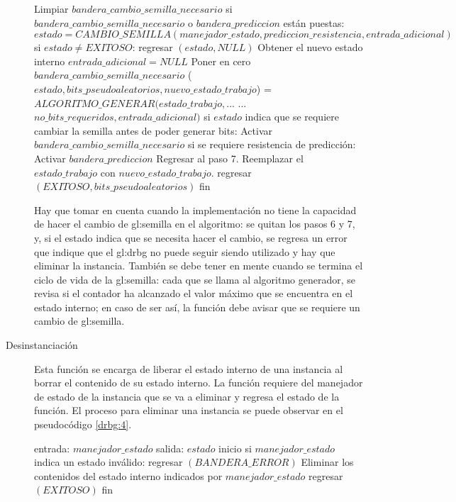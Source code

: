 \begin{description}
\begin{pseudocodigo}[caption={DRBG, generación.}, label={drbg:3}]
      Limpiar $bandera\_cambio\_semilla\_necesario$
      si $bandera\_cambio\_semilla\_necesario$ o $bandera\_prediccion$ están puestas:
        $estado = CAMBIO\_SEMILLA(manejador\_estado, prediccion\_resistencia, entrada\_adicional)$
        si $estado \neq EXITOSO$:
          regresar $(estado, NULL)$
        Obtener el nuevo estado interno
        $entrada\_adicional = NULL$
        Poner en cero $bandera\_cambio\_semilla\_necesario$
      ($estado, bits\_pseudoaleatorios, nuevo\_estado\_trabajo$) = $ALGORITMO\_GENERAR(estado\_trabajo,$...
        ...$no\_bits\_requeridos, entrada\_adicional)$
      si $estado$ indica que se requiere cambiar la semilla antes de poder generar bits:
        Activar $bandera\_cambio\_semilla\_necesario$
        si se requiere resistencia de predicción:
          Activar $bandera\_prediccion$
        Regresar al paso 7.
      Reemplazar el $estado\_trabajo$ con $nuevo\_estado\_trabajo$.
      regresar $(EXITOSO, bits\_pseudoaleatorios)$
    fin
\end{pseudocodigo}
    Hay que tomar en cuenta cuando la implementación no tiene la capacidad de
    hacer el cambio de \gls{gl:semilla} en el algoritmo: se quitan los pasos 6 y
    7, y, si el estado indica que se necesita hacer el cambio, se regresa un
    error que indique que el \gls{gl:drbg} no puede seguir siendo utilizado y
    hay que eliminar la instancia. También se debe tener en mente cuando se
    termina el ciclo de vida de la \gls{gl:semilla}: cada que se llama al
    algoritmo generador, se revisa si el contador ha alcanzado el valor máximo
    que se encuentra en el estado interno; en caso de ser así, la función debe
    avisar que se requiere un cambio de \gls{gl:semilla}.

  \item [Desinstanciación] Esta función se encarga de liberar el estado interno
    de una instancia al borrar el contenido de su estado interno. La función
    requiere del manejador de estado de la instancia que se va a eliminar y
    regresa el estado de la función. El proceso para eliminar una instancia se
    puede observar en el pseudocódigo \ref{drbg:4}.

\begin{pseudocodigo}[caption={DRBG, desinstanciación.}, label={drbg:4}]
    entrada:  $manejador\_estado$
    salida:   $estado$
    inicio
      si $manejador\_estado$ indica un estado inválido:
        regresar $(BANDERA\_ERROR)$
      Eliminar los contenidos del estado interno indicados por $manejador\_estado$
      regresar $(EXITOSO)$
    fin
\end{pseudocodigo}

\end{description}
